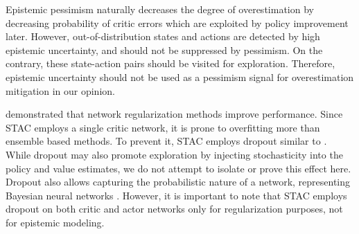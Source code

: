 \documentclass{article}
\begin{document}
Epistemic pessimism naturally decreases the degree of overestimation by decreasing probability of critic errors which are exploited by policy improvement later. However, out-of-distribution states and actions are detected by high epistemic uncertainty, and should not be suppressed by pessimism. On the contrary, these state-action pairs should be visited for exploration. Therefore, epistemic uncertainty should not be used as a pessimism signal for overestimation mitigation in our opinion. 

\citep{nauman2024overestimation} demonstrated that network regularization methods improve performance. Since STAC employs a single critic network, it is prone to overfitting more than ensemble based methods. To prevent it, STAC employs dropout \citep{srivastava2014dropout} similar to \citet{hiraoka2021dropout}. While dropout may also promote exploration by injecting stochasticity into the policy and value estimates, we do not attempt to isolate or prove this effect here. Dropout also allows capturing the probabilistic nature of a network, representing Bayesian neural networks \citep{Gal2016Dropout}. However, it is important to note that STAC employs dropout on both critic and actor networks only for regularization purposes, not for epistemic modeling. 
\end{document}
